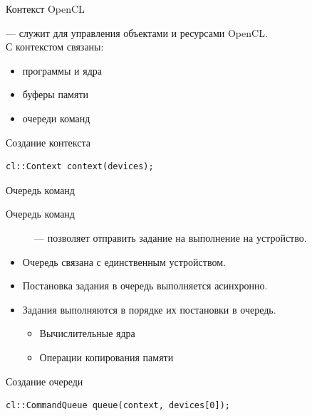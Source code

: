 \documentclass[@BEAMER_OPTIONS@]{beamer}
\begin{document}
\begin{frame}[fragile]{Контекст OpenCL}
    \begin{description}[\;\;]
        \item[Контекст] --- служит для управления объектами и ресурсами
            OpenCL.\\
            \vspace{\baselineskip}
            С контекстом связаны:
            \begin{itemize}
                \item программы и ядра
                \item буферы памяти
                \item очереди команд
            \end{itemize}
    \end{description}
    \begin{exampleblock}{Создание контекста}
        \begin{lstlisting}
cl::Context context(devices);
        \end{lstlisting}
    \end{exampleblock}
\end{frame}

\begin{frame}[fragile]{Очередь команд}
    \begin{description}
        \item[Очередь команд] --- позволяет отправить задание на выполнение на
            устройство.
    \end{description}
    \begin{itemize}
        \item Очередь связана с единственным устройством.
        \item Постановка задания в очередь выполняется асинхронно.
        \item Задания выполняются в порядке их постановки в очередь.
            \begin{itemize}
                \item Вычислительные ядра
                \item Операции копирования памяти
            \end{itemize}
    \end{itemize}
    \begin{exampleblock}{Создание очереди}
        \begin{lstlisting}
cl::CommandQueue queue(context, devices[0]);
        \end{lstlisting}
    \end{exampleblock}
\end{frame}
\end{document}
